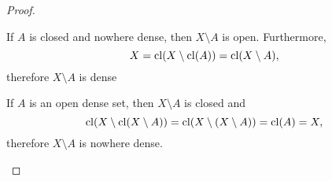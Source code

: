 \begin{proof}
\begin{description}
    \mbox{}
    \begin{description}
      \Implies If \( A \) is closed and nowhere dense, then \( X \setminus A \) is open. Furthermore,
      \begin{equation*}
        X
        =
        \operatorname{cl}(X \setminus \operatorname{cl}(A))
        =
        \operatorname{cl}(X \setminus A),
      \end{equation*}
      therefore \( X \setminus A \) is dense

      \ImpliedBy If \( A \) is an open dense set, then \( X \setminus A \) is closed and
      \begin{equation*}
        \operatorname{cl}(X \setminus \operatorname{cl}(X \setminus A))
        =
        \operatorname{cl}(X \setminus (X \setminus A))
        =
        \operatorname{cl}(A)
        =
        X,
      \end{equation*}
      therefore \( X \setminus A \) is nowhere dense.
    \end{description}
  \end{description}
\end{proof}
